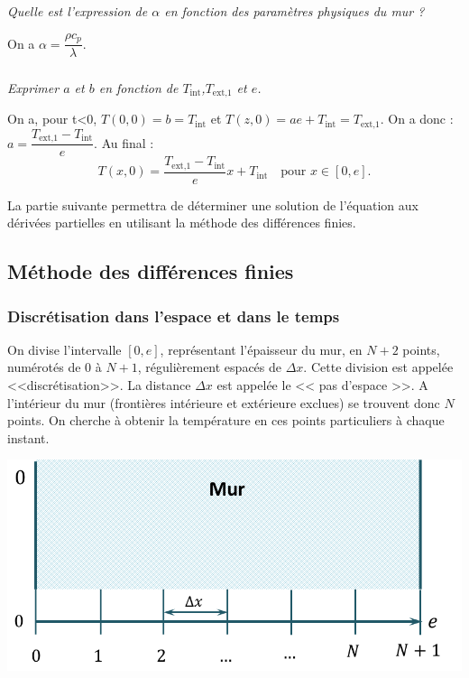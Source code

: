 \documentclass[10pt,fleqn]{article} %
\begin{document}
\subparagraph{}\textit{Quelle est l'expression de $\alpha$ en fonction des paramètres physiques du mur ?}
\ifprof
\begin{corrige}
On a $\alpha =\dfrac{\rho c_p}{\lambda}$.

\end{corrige}

\else
\fi

\subparagraph{\label{q_tini}}\textit{Exprimer $a$ et $b$ en fonction de $T_{\text{int}}$,$T_{\text{ext,1}}$ et $e$.}
\ifprof
\begin{corrige}
On a, pour t<0, $T(0,0)= b = T_{\text{int}}$ et  $T(z,0)= ae+ T_{\text{int}}= T_{\text{ext,1}}$. On a donc : $a= \dfrac{T_{\text{ext,1}}- T_{\text{int}}}{e}$. Au final :
$$T(x,0)=\dfrac{T_{\text{ext,1}}- T_{\text{int}}}{e} x + T_{\text{int}} \quad \text{pour } x\in[0,e].$$
\end{corrige}
\else
\fi

La partie suivante permettra de déterminer une solution de l'équation aux dérivées partielles en utilisant la méthode des différences finies.

\subsection{Méthode des différences finies}
\subsubsection{Discrétisation dans l'espace et dans le temps}

\noindent \begin{minipage}[c]{.6\linewidth}
On divise l'intervalle $[0,e]$, représentant l'épaisseur du mur, en $N+2$ points, numérotés de 0 à $N+1$, régulièrement espacés de $\Delta x$. Cette division est appelée <<discrétisation>>. La distance $\Delta x$ est appelée le << pas d’espace >>. A l'intérieur du mur (frontières intérieure et extérieure exclues) se trouvent donc $N$ points. On cherche à obtenir la température en ces points particuliers à chaque instant. 


\end{minipage} \hfill
\begin{minipage}[c]{.38\linewidth}
\begin{center}
\includegraphics[width=\linewidth]{images/figure_02}
\end{center}
\end{minipage}
\end{document}
